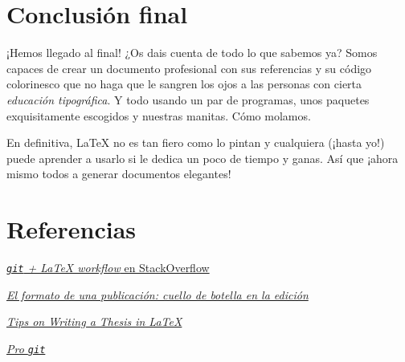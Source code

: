 \section{Conclusión final}

¡Hemos llegado al final! ¿Os dais cuenta de todo lo que sabemos ya?
Somos capaces de crear un documento profesional con sus referencias y su
código colorinesco que no haga que le sangren los ojos a las personas
con cierta \emph{educación tipográfica}. Y todo usando un par de
programas, unos paquetes exquisitamente escogidos y nuestras manitas.
Cómo molamos.

En definitiva, LaTeX no es tan fiero como lo pintan y cualquiera (¡hasta
yo!) puede aprender a usarlo si le dedica un poco de tiempo y ganas. Así
que ¡ahora mismo todos a generar documentos elegantes!

\section{Referencias}

\href{http://stackoverflow.com/questions/6188780/git-latex-workflow}{\emph{\lstinline!git!
+ LaTeX workflow} en StackOverflow}

\href{http://marianaeguaras.com/el-formato-de-una-publicacion-cuello-de-botella-en-la-edicion/}{\emph{El
formato de una publicación: cuello de botella en la edición}}

\href{http://www.khirevich.com/latex/microtype/}{\emph{Tips on Writing a
Thesis in LaTeX}}

\href{https://git-scm.com/book/en/v2}{\emph{Pro \lstinline!git!}}
